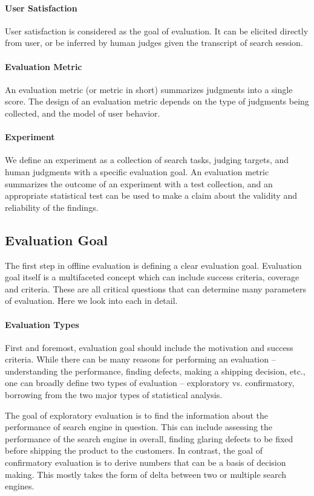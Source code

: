 \paragraph{User Satisfaction} User satisfaction is considered as the goal of evaluation. It can be elicited directly from user, or be inferred by human judges given the transcript of search session.

\paragraph{Evaluation Metric} An evaluation metric (or metric in short) summarizes judgments into a single score. The design of an evaluation metric depends on the type of judgments being collected, and the model of user behavior.

\paragraph{Experiment} We define an experiment as a collection of search tasks, judging targets, and human judgments with a specific evaluation goal. An evaluation metric summarizes the outcome of an experiment with a test collection, and an appropriate statistical test can be used to make a claim about the validity and reliability of the findings.

\subsection{Evaluation Goal}
The first step in offline evaluation is defining a clear evaluation goal. Evaluation goal itself is a multifaceted concept which can include success criteria, coverage and criteria. These are all critical questions that can determine many parameters of evaluation. Here we look into each in detail.

\paragraph{Evaluation Types}
First and foremost, evaluation goal should include the motivation and success criteria. While there can be many reasons for performing an evaluation -- understanding the performance, finding defects, making a shipping decision, etc., one can broadly define two types of evaluation -- exploratory vs. confirmatory, borrowing from the two major types of statistical analysis. %

The goal of exploratory evaluation is to find the information about the performance of search engine in question. This can include assessing the performance of the search engine in overall, finding glaring defects to be fixed before shipping the product to the customers. In contrast, the goal of confirmatory evaluation is to derive numbers that can be a basis of decision making. This mostly takes the form of delta between two or multiple search engines. 

